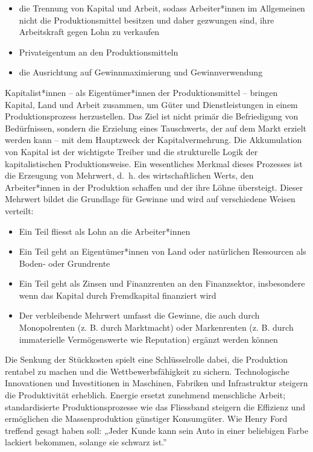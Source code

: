 \documentclass[
  nswissgerman,
  a4paper,
  DIV=11,
  numbers=noendperiod,
  oneside,
  openany]{scrreprt}
\begin{document}
\begin{itemize}
\item
  die Trennung von Kapital und Arbeit, sodass Arbeiter*innen im
  Allgemeinen nicht die Produktionsmittel besitzen und daher gezwungen
  sind, ihre Arbeitskraft gegen Lohn zu verkaufen
\item
  Privateigentum an den Produktionsmitteln
\item
  die Ausrichtung auf Gewinnmaximierung und Gewinnverwendung
\end{itemize}

Kapitalist*innen -- als Eigentümer*innen der Produktionsmittel --
bringen Kapital, Land und Arbeit zusammen, um Güter und Dienstleistungen
in einem Produktionsprozess herzustellen. Das Ziel ist nicht primär die
Befriedigung von Bedürfnissen, sondern die Erzielung eines Tauschwerts,
der auf dem Markt erzielt werden kann -- mit dem Hauptzweck der
Kapitalvermehrung. Die Akkumulation von Kapital ist der wichtigste
Treiber und die strukturelle Logik der kapitalistischen
Produktionsweise. Ein wesentliches Merkmal dieses Prozesses ist die
Erzeugung von Mehrwert, d.~h. des wirtschaftlichen Werts, den
Arbeiter*innen in der Produktion schaffen und der ihre Löhne übersteigt.
Dieser Mehrwert bildet die Grundlage für Gewinne und wird auf
verschiedene Weisen verteilt:

\begin{itemize}
\item
  Ein Teil fliesst als Lohn an die Arbeiter*innen
\item
  Ein Teil geht an Eigentümer*innen von Land oder natürlichen Ressourcen
  als Boden- oder Grundrente
\item
  Ein Teil geht als Zinsen und Finanzrenten an den Finanzsektor,
  insbesondere wenn das Kapital durch Fremdkapital finanziert wird
\item
  Der verbleibende Mehrwert umfasst die Gewinne, die auch durch
  Monopolrenten (z. B. durch Marktmacht) oder Markenrenten (z. B. durch
  immaterielle Vermögenswerte wie Reputation) ergänzt werden können
\end{itemize}

Die Senkung der Stückkosten spielt eine Schlüsselrolle dabei, die
Produktion rentabel zu machen und die Wettbewerbsfähigkeit zu sichern.
Technologische Innovationen und Investitionen in Maschinen, Fabriken und
Infrastruktur steigern die Produktivität erheblich. Energie ersetzt
zunehmend menschliche Arbeit; standardisierte Produktionsprozesse wie
das Fliessband steigern die Effizienz und ermöglichen die
Massenproduktion günstiger Konsumgüter. Wie Henry Ford treffend gesagt
haben soll: „Jeder Kunde kann sein Auto in einer beliebigen Farbe
lackiert bekommen, solange sie schwarz ist.''
\end{document}
